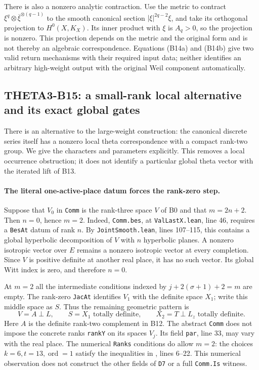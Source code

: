 \documentclass[11pt]{article}
\theoremstyle{definition}\newtheorem{definition}[theorem]{Definition}\newtheorem{remark}[theorem]{Remark}
\begin{document}
There is also a nonzero analytic contraction. Use the metric to contract
$\xi^q\otimes\overline{\xi}^{\otimes(q-1)}$ to the smooth canonical section
$|\xi|^{2q-2}\xi$, and take its orthogonal projection to $H^0(X,K_X)$. Its inner product with $\xi$ is $A_q>0$, so the projection is nonzero. This projection depends on the metric and the original form and is not thereby an algebraic correspondence. Equations (B14a) and (B14b) give two valid return mechanisms with their required input data; neither identifies an arbitrary high-weight output with the original Weil component automatically.

\subsection{THETA3-B15: a small-rank local alternative and its exact global gates}\label{B15}

There is an alternative to the large-weight construction: the canonical discrete series itself has a nonzero local theta correspondence with a compact rank-two group. We give the characters and parameters explicitly. This removes a local occurrence obstruction; it does not identify a particular global theta vector with the iterated lift of B13.

\paragraph{The literal one-active-place datum forces the rank-zero step.}
Suppose that $V_0$ in \texttt{Comm} is the rank-three space $V$ of B0 and that $m=2n+2$. Then $n=0$, hence $m=2$. Indeed, \texttt{Comm.bes}, at \texttt{ValLastX.lean}, line 46, requires a \texttt{BesAt} datum of rank $n$. By \texttt{JointSmooth.lean}, lines 107--115, this contains a global hyperbolic decomposition of $V$ with $n$ hyperbolic planes. A nonzero isotropic vector over $E$ remains a nonzero isotropic vector at every completion. Since $V$ is positive definite at another real place, it has no such vector. Its global Witt index is zero, and therefore $n=0$.

At $m=2$ all the intermediate conditions indexed by $j+2(\sigma+1)+2=m$ are empty. The rank-zero \texttt{JacAt} identifies $V_1$ with the definite space $X_1$; write this middle space as $S$. Thus the remaining geometric pattern is
\[
 V=A\perp L,\qquad S=X_1\text{ totally definite},\qquad
 X_2=T\perp L_z\text{ totally definite}.
 \tag{B15a}
\]
Here $A$ is the definite rank-two complement in B12. The abstract \texttt{Comm} does not impose the concrete ranks \texttt{rankY} on its spaces $V_j$. Its field \texttt{par}, line 33, may vary with the real place. The numerical \texttt{Ranks} conditions do allow $m=2$: the choices $k=6,t=13,\operatorname{ord}=1$ satisfy the inequalities in , lines 6--22. This numerical observation does not construct the other fields of \texttt{D7} or a full \texttt{Comm.Is} witness.
\end{document}
